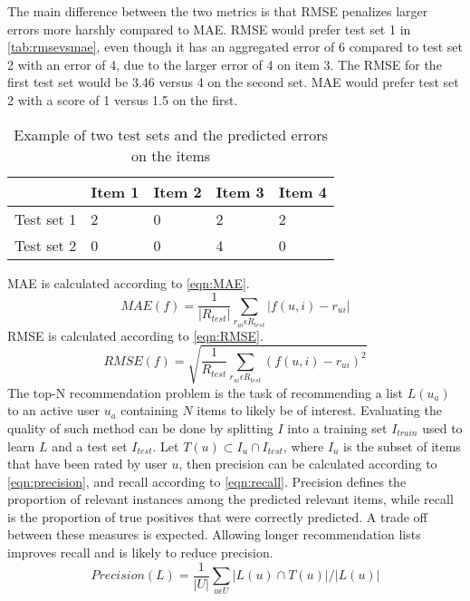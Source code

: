 The main difference between the two metrics is that RMSE penalizes larger errors more harshly compared to MAE.
RMSE would prefer test set 1 in \autoref{tab:rmsevsmae}, even though it has an aggregated error of 6 compared to test set 2 with an error of 4, due to the larger error of 4 on item 3.
The RMSE for the first test set would be 3.46 versus 4 on the second set.
MAE would prefer test set 2 with a score of 1 versus 1.5 on the first.
\begin{table}[]
    \begin{tabular}{|l|l|l|l|l|}
    \hline
               & Item 1 & Item 2 & Item 3 & Item 4 \\ \hline
    Test set 1 & 2      & 0      & 2      & 2      \\ \hline
    Test set 2 & 0      & 0      & 4      & 0      \\ \hline
    \end{tabular}
    \caption{Example of two test sets and the predicted errors on the items}
    \label{tab:rmsevsmae}
\end{table}
MAE is calculated according to \autoref{eqn:MAE}.
\begin{equation}
    \label{eqn:MAE}
    MAE(f) = \frac{1}{|R_{test}|} \sum\limits_{r_{ui} \epsilon R_{test}} |f(u,i)-r_{ui}|
\end{equation}
RMSE is calculated according to \autoref{eqn:RMSE}.
\begin{equation}
    \label{eqn:RMSE}
    RMSE(f) = \sqrt{\frac{1}{R_{test}} \sum\limits_{r_{ui} \epsilon R_{test}} (f(u, i) - r_{ui})^2}
\end{equation}
The top-N recommendation problem is the task of recommending a list $L(u_a)$ to an active user $u_a$ containing $N$ items to likely be of interest.
Evaluating the quality of such method can be done by splitting $I$ into a training set $I_{train}$ used to learn $L$ and a test set $I_{test}$.
Let $T(u) \subset I_u \cap I_{test}$, where $I_u$ is the subset of items that have been rated by user $u$, then precision can be calculated according to \autoref{eqn:precision}, and recall according to \autoref{eqn:recall}.
Precision defines the proportion of relevant instances among the predicted relevant items, while recall is the proportion of true positives that were correctly predicted.
A trade off between these measures is expected.
Allowing longer recommendation lists improves recall and is likely to reduce precision\cite{RecommenderHandbook2015}.
\begin{equation}
    \label{eqn:precision}
    Precision(L) = \frac{1}{|U|} \sum\limits_{u \epsilon U} |L(u) \cap T(u)| / |L(u)|
\end{equation}
